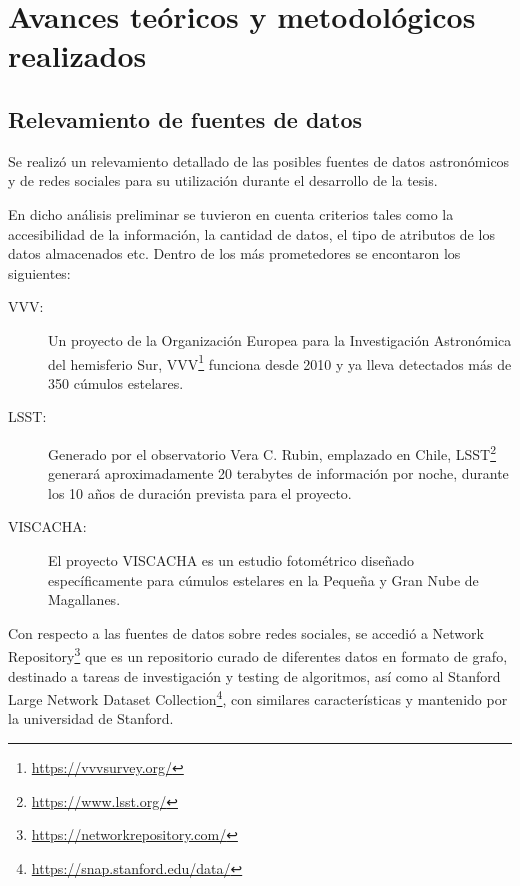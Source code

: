\documentclass[
	11pt,oneside,a4paper,
	fleqn,
	article
]{memoir}
\begin{document}


\section {Avances teóricos y metodológicos realizados}

\subsection{Relevamiento de fuentes de datos}

Se realizó un relevamiento detallado de las posibles fuentes de datos astronómicos y de redes sociales para su utilización durante el desarrollo de la tesis.

En dicho análisis preliminar se tuvieron en cuenta criterios tales como la accesibilidad de la información, la cantidad de datos, el tipo de atributos de los datos almacenados etc. Dentro de los más prometedores se encontaron los siguientes:


\begin{description}
	\item[VVV:] Un proyecto de la Organización Europea para la Investigación Astronómica del hemisferio Sur, VVV\footnote{\href{https://vvvsurvey.org/}{https://vvvsurvey.org/}} funciona desde 2010 y ya lleva detectados más de 350 cúmulos estelares\cite{borissova2011new}.
	\item[LSST:] Generado por el observatorio Vera C. Rubin, emplazado en Chile, LSST\footnote{\href{https://www.lsst.org/}{https://www.lsst.org/}} generará aproximadamente 20 terabytes de información por noche, durante los 10 años de duración prevista para el proyecto\cite{tyson2002large,juric2015lsst}.
	\item[VISCACHA:] El proyecto VISCACHA es un estudio fotométrico diseñado específicamente para cúmulos estelares en la Pequeña y Gran Nube de Magallanes\cite{maia2019viscacha}.
\end{description}

Con respecto a las fuentes de datos sobre redes sociales, se accedió a Network Repository\footnote{\href{https://networkrepository.com/}{https://networkrepository.com/}} que es un repositorio curado de diferentes datos en formato de grafo, destinado a tareas de investigación y testing de algoritmos\cite{nr}, así como al Stanford Large Network Dataset Collection\footnote{\href{https://snap.stanford.edu/data/}{https://snap.stanford.edu/data/}}, con similares características y mantenido por la universidad de Stanford.
\end{document}
